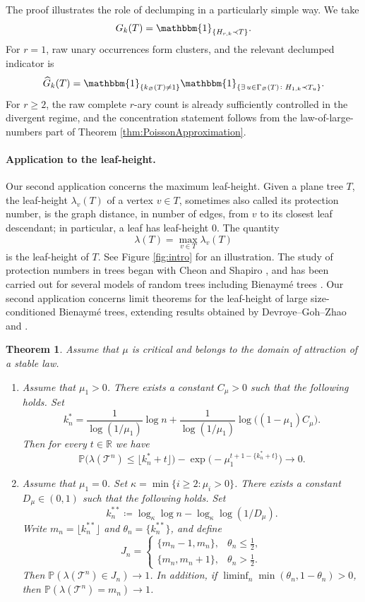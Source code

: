\documentclass[a4paper,11pt]{article}
\newtheorem{theorem}{Theorem}[section]
\DeclareRobustCommand{\P}{\mathbb{P}}
\DeclareRobustCommand{\1}{\mathbf{1}}
\begin{document}
The proof illustrates the role of declumping in a particularly simple way. We
take
$$
G_k(T)=\mathbbm{1}_{\{H_{r,k}\prec T\}}.
$$
For $r=1$, raw unary occurrences form clusters, and the relevant declumped
indicator is
$$
\widehat{G}_{k}(T)
=
\mathbbm{1}_{\{k_{\varnothing}(T) \neq 1\}}
\mathbbm{1}_{\{\exists\, u \in \Gamma_{\varnothing}(T) \colon H_{1,k}\prec T_u\}}.
$$
For $r\ge2$, the raw complete $r$-ary count is already sufficiently controlled
in the divergent regime, and the concentration statement follows from the
law-of-large-numbers part of Theorem \ref{thm:PoissonApproximation}.

\paragraph{Application to the leaf-height.}

Our second application concerns the maximum leaf-height. Given a plane tree
$T$, the leaf-height $\lambda_v(T)$ of a vertex $v\in T$, sometimes also called its protection number, is the graph distance, in number of edges, from $v$ to its closest leaf descendant; in particular, a leaf has leaf-height $0$. The quantity
$$
\lambda(T)=\max_{v\in T}\lambda_v(T)
$$
is the leaf-height of $T$. See Figure \ref{fig:intro} for an illustration. The study of protection numbers in trees began with Cheon and Shapiro \cite{CS08}, and has been carried out for several models of random trees \cite{Man11,DP12,MW15,HJ15,GGLS23} including Bienaymé trees \cite{DJ14,Cop17,HP17,GGLS23,DGZ23,HSW24}. Our second application concerns limit theorems for the leaf-height of large size-conditioned Bienaymé trees, extending results obtained by Devroye--Goh--Zhao
\cite{DGZ23} and \cite{HSW24}.

\begin{theorem}
\label{thm:max_lh} Assume that $\mu$ is critical and belongs to the domain of attraction of a stable law.
\begin{enumerate}
\item[(i)]  Assume that $\mu_{1}>0$. There exists a constant $C_{\mu}>0$ such that the following holds. Set
$$k^*_{n} =  \frac{1}{\log(1/\mu_{1})}\log n +  \frac{1}{\log(1/\mu_{1})} \log\bigl((1-\mu_1)C_{\mu}\bigr).$$
Then for every $t \in \mathbb{R}$ we have
\[
\P\bigl(\lambda(\mathcal{T}^n) \leq \lfloor k^*_{n} + t\rfloor\bigr) - \exp\bigl(-\mu_1^{t+1 - \{k^*_{n} + t\}}\bigr) \to 0.
\]
\item[(ii)] Assume that $\mu_{1}=0$. Set $\kappa = \min\{i \geq 2 : \mu_i > 0\}$. There exists a constant $D_{\mu} \in (0,1)$ such that the following holds. Set
$$
k_{n}^{**} \coloneqq  \log_\kappa \log n - \log_\kappa \log(1/D_{\mu}).
$$
 Write $m_n=\lfloor k_n^{**}\rfloor$ and
$\theta_n=\{k_n^{**}\}$, and define
$$
  J_n=
  \begin{cases}
    \{m_n-1,m_n\},&\theta_n\le\tfrac12,\\
    \{m_n,m_n+1\},&\theta_n>\tfrac12.
  \end{cases}
$$
Then $\P(\lambda(\mathcal T^n)\in J_n)\longrightarrow1$. In addition, if $\liminf_n\min(\theta_n,1-\theta_n)>0$, then
$\P(\lambda(\mathcal T^n)=m_n)\to1$.
\end{enumerate}
\end{theorem}
\end{document}
